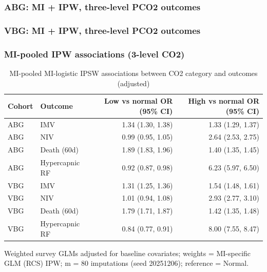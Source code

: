 \documentclass[
  11pt,
  letterpaper,
  DIV=11,
  numbers=noendperiod]{scrartcl}
\begin{document}
\subsubsection{ABG: MI + IPW, three-level PCO2
outcomes}\label{abg-mi-ipw-three-level-pco2-outcomes}

\subsubsection{VBG: MI + IPW, three-level PCO2
outcomes}\label{vbg-mi-ipw-three-level-pco2-outcomes}

\subsubsection{MI-pooled IPW associations (3-level
CO2)}\label{mi-pooled-ipw-associations-3-level-co2}

\begin{table}
\caption*{
{\fontsize{20}{25}\selectfont  MI-pooled MI-logistic IPSW associations between CO2 category and outcomes (adjusted)\fontsize{12}{15}\selectfont }
} 
\fontsize{12.0pt}{14.0pt}\selectfont
\begin{tabular*}{\linewidth}{@{\extracolsep{\fill}}llrr}
\toprule
Cohort & Outcome & Low vs normal OR (95\% CI) & High vs normal OR (95\% CI) \\ 
\midrule\addlinespace[2.5pt]
ABG & IMV & 1.34 (1.30, 1.38) & 1.33 (1.29, 1.37) \\ 
ABG & NIV & 0.99 (0.95, 1.05) & 2.64 (2.53, 2.75) \\ 
ABG & Death (60d) & 1.89 (1.83, 1.96) & 1.40 (1.35, 1.45) \\ 
ABG & Hypercapnic RF & 0.92 (0.87, 0.98) & 6.23 (5.97, 6.50) \\ 
VBG & IMV & 1.31 (1.25, 1.36) & 1.54 (1.48, 1.61) \\ 
VBG & NIV & 1.01 (0.94, 1.08) & 2.93 (2.77, 3.10) \\ 
VBG & Death (60d) & 1.79 (1.71, 1.87) & 1.42 (1.35, 1.48) \\ 
VBG & Hypercapnic RF & 0.84 (0.77, 0.91) & 8.00 (7.55, 8.47) \\ 
\bottomrule
\end{tabular*}
\begin{minipage}{\linewidth}
\vspace{.05em}
Weighted survey GLMs adjusted for baseline covariates; weights = MI-specific GLM (RCS) IPW; m = 80 imputations (seed 20251206); reference = Normal.\\
\end{minipage}
\end{table}
\end{document}
